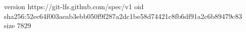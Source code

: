 version https://git-lfs.github.com/spec/v1
oid sha256:52ec64f003aeab3ebb050f9f287a2dc1be58d74421c8fb6df91a2c6b89479c83
size 7829
